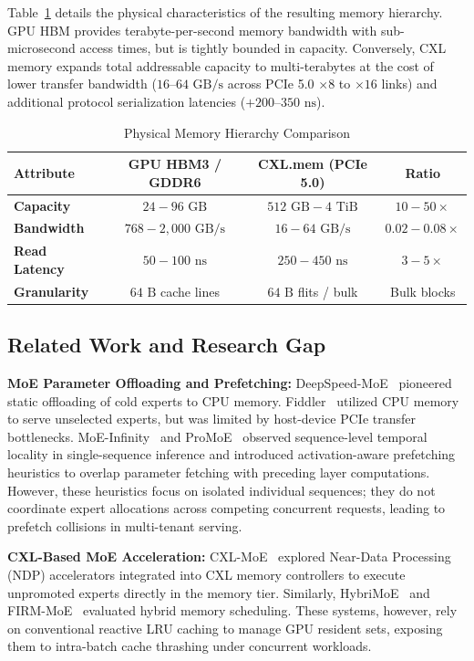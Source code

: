 \documentclass[10pt,journal,compsoc]{IEEEtran}
\begin{document}
Table~\ref{tab:memory_hierarchy} details the physical characteristics of the resulting memory hierarchy. GPU HBM provides terabyte-per-second memory bandwidth with sub-microsecond access times, but is tightly bounded in capacity. Conversely, CXL memory expands total addressable capacity to multi-terabytes at the cost of lower transfer bandwidth ($16\text{--}64\text{ GB/s}$ across PCIe 5.0 $\times 8$ to $\times 16$ links) and additional protocol serialization latencies ($+200\text{--}350\text{ ns}$).

\begin{table}[t]
\caption{Physical Memory Hierarchy Comparison}
\label{tab:memory_hierarchy}
\centering
\begin{tabular}{@{}lccc@{}}
\toprule
\textbf{Attribute} & \textbf{GPU HBM3 / GDDR6} & \textbf{CXL.mem (PCIe 5.0)} & \textbf{Ratio} \\
\midrule
\textbf{Capacity} & $24 - 96\text{ GB}$ & $512\text{ GB} - 4\text{ TiB}$ & $10 - 50\times$ \\
\textbf{Bandwidth} & $768 - 2,000\text{ GB/s}$ & $16 - 64\text{ GB/s}$ & $0.02 - 0.08\times$ \\
\textbf{Read Latency} & $50 - 100\text{ ns}$ & $250 - 450\text{ ns}$ & $3 - 5\times$ \\
\textbf{Granularity} & $64\text{ B}$ cache lines & $64\text{ B}$ flits / bulk & Bulk blocks \\
\bottomrule
\end{tabular}
\end{table}

\subsection{Related Work and Research Gap}
\textbf{MoE Parameter Offloading and Prefetching:} DeepSpeed-MoE~\cite{rajbhandari2022deepspeed} pioneered static offloading of cold experts to CPU memory. Fiddler~\cite{fiddler2024} utilized CPU memory to serve unselected experts, but was limited by host-device PCIe transfer bottlenecks. MoE-Infinity~\cite{fu2024moeinfinity} and ProMoE~\cite{promoe2025} observed sequence-level temporal locality in single-sequence inference and introduced activation-aware prefetching heuristics to overlap parameter fetching with preceding layer computations. However, these heuristics focus on isolated individual sequences; they do not coordinate expert allocations across competing concurrent requests, leading to prefetch collisions in multi-tenant serving.

\textbf{CXL-Based MoE Acceleration:} CXL-MoE~\cite{cxlmoe2023} explored Near-Data Processing (NDP) accelerators integrated into CXL memory controllers to execute unpromoted experts directly in the memory tier. Similarly, HybriMoE~\cite{hybrimoe2024} and FIRM-MoE~\cite{firmmoe2024} evaluated hybrid memory scheduling. These systems, however, rely on conventional reactive LRU caching to manage GPU resident sets, exposing them to intra-batch cache thrashing under concurrent workloads.
\end{document}
